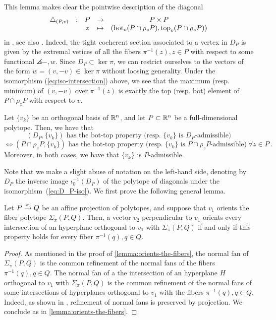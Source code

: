 This lemma makes clear the pointwise description of the diagonal
\begin{equation*}
	\begin{matrix}
		\triangle_{(P,v)} & : & P & \to & P \times P \\
		& & z  & \mapsto & (\operatorname{bot}_v(P \cap \rho_z P),\operatorname{top}_v(P \cap \rho_z P))
	\end{matrix}
\end{equation*}
in \cite[Definition 10]{MTTV19}, see also \cite[Proposition 1.15]{GLA21}.
Indeed, the tight coeherent section associated to a vertex in $D_P$ is given by the extremal vetices of all the fibers $\pi^{-1}(z), z \in P$ with respect to some functional $\angles{-,w}$.
Since $D_P \subset \ker \pi$, we can restrict ourselves to the vectors of the form $w=(v,-v) \in \ker \pi$ without loosing generality.
Under the isomorphism (\ref{eq:iso-intersection}) above, we see that the maximum (resp. minimum) of $(v,-v)$ over $\pi^{-1}(z)$ is exactly the top (resp. bot) element of $P\cap \rho_z P$ with respect to $v$.

\begin{proposition} \label{prop:bot-top-for-D_P}
	Let $\{v_k\}$ be an orthogonal basis of $\mathbb{R}^n$, and let $P\subset \mathbb{R}^n$ be a full-dimensional polytope.
	Then, we have that
	\[
	(D_P,\{v_k\}) \text{ has the bot-top property (resp. } \{v_k\} \text{ is }D_P\text{-admissible)}
	\]
	\[
	\iff (P\cap \rho_z P,\{v_k\}) \text{ has the bot-top property (resp. } \{v_k\} \text{ is }P\cap \rho_z P\text{-admissible)} \ \forall z \in P \ .
	\]
	Moreover, in both cases, we have that $\{v_k\}$ is $P$-admissible.
\end{proposition}
Note that we make a slight abuse of notation on the left-hand side, denoting by $D_P$ the inverse image $\iota_0^{-1}(D_P)$ of the polytope of diagonals under the isomorphism~(\ref{eq:D_P-iso}).
We first prove the following general lemma.

\begin{lemma} \label{lemma:iterated-orientation}
	Let $P\xrightarrow{\pi} Q$ be an affine projection of polytopes, and suppose that $v_1$ orients the fiber polytope $\Sigma_\pi (P,Q)$.
	Then, a vector $v_2$ perpendicular to $v_1$ orients every intersection of an hyperplane orthogonal to $v_1$ with $\Sigma_\pi (P,Q)$ if and only if this property holds for every fiber $\pi^{-1}(q), q \in Q$.
\end{lemma}

\begin{proof}
	As mentioned in the proof of \cref{lemma:orients-the-fibers}, the normal fan of $\Sigma_\pi(P,Q)$ is the common refinement of the normal fans of the fibers $\pi^{-1}(q), q \in Q$.
	The normal fan of a the intersection of an hyperplane $H$ orthogonal to $v_1$ with $\Sigma_\pi(P,Q)$ is the common refinement of the normal fans of some intersections of hyperplanes orthogonal to $v_1$ with the fibers $\pi^{-1}(q), q \in Q$.
	Indeed, as shown in \cite[Lemma 3.1]{BilleraSturmfels94}, refinement of normal fans is preserved by projection.
	We conclude as in \cref{lemma:orients-the-fibers}.
\end{proof}

